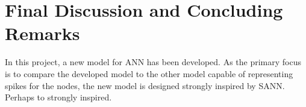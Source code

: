 	







%
%

\section{Final Discussion and Concluding Remarks}
In this project, a new model for ANN has been developed.
As the primary focus is to compare the developed model to the other model capable of representing spikes for the nodes, the new model is designed strongly inspired by SANN.
Perhaps to strongly inspired.

